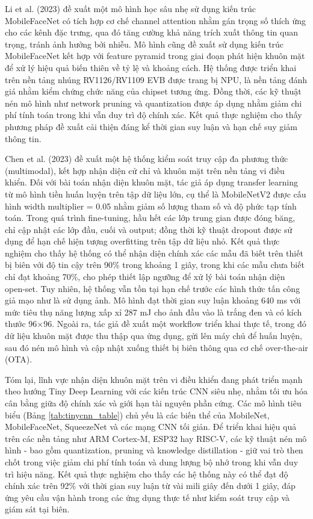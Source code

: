 Li et al. (2023)\cite{17_10128985} đề xuất một mô hình học sâu nhẹ sử dụng kiến trúc MobileFaceNet có tích hợp cơ chế channel attention nhằm gán trọng số thích ứng cho các kênh đặc trưng, qua đó tăng cường khả năng trích xuất thông tin quan trọng, tránh ảnh hưởng bởi nhiễu. Mô hình cũng đề xuất sử dụng kiến trúc MobileFaceNet kết hợp với feature pyramid trong giai đoạn phát hiện khuôn mặt để xử lý hiệu quả biến thiên về tỷ lệ và khoảng cách. Hệ thống được triển khai trên nền tảng nhúng RV1126/RV1109 EVB được trang bị NPU, là nền tảng đánh giá nhằm kiểm chứng chức năng của chipset tương ứng. Đồng thời, các kỹ thuật nén mô hình như network pruning và quantization được áp dụng nhằm giảm chi phí tính toán trong khi vẫn duy trì độ chính xác. Kết quả thực nghiệm cho thấy phương pháp đề xuất cải thiện đáng kể thời gian suy luận và hạn chế suy giảm thông tin.

Chen et al. (2023)\cite{35_10457480} đề xuất một hệ thống kiểm soát truy cập đa phương thức (multimodal), kết hợp nhận diện cử chỉ và khuôn mặt trên nền tảng vi điều khiển. Đối với bài toán nhận diện khuôn mặt, tác giả áp dụng transfer learning từ mô hình tiền huấn luyện trên tập dữ liệu lớn, cụ thể là MobileNetV2 được cấu hình width multiplier = 0.05 nhằm giảm số lượng tham số và độ phức tạp tính toán. Trong quá trình fine-tuning, hầu hết các lớp trung gian được đóng băng, chỉ cập nhật các lớp đầu, cuối và output; đồng thời kỹ thuật dropout được sử dụng để hạn chế hiện tượng overfitting trên tập dữ liệu nhỏ. Kết quả thực nghiệm cho thấy hệ thống có thể nhận diện chính xác các mẫu đã biết trên thiết bị biên với độ tin cậy trên 90\% trong khoảng 1 giây, trong khi các mẫu chưa biết chỉ đạt khoảng 70\%, cho phép thiết lập ngưỡng để xử lý bài toán nhận diện open-set. Tuy nhiên, hệ thống vẫn tồn tại hạn chế trước các hình thức tấn công giả mạo như là sử dụng ảnh. Mô hình đạt thời gian suy luận khoảng 640 ms với mức tiêu thụ năng lượng xấp xỉ 287 mJ cho ảnh đầu vào là trắng đen và có kích thước 96×96. Ngoài ra, tác giả đề xuất một workflow triển khai thực tế, trong đó dữ liệu khuôn mặt được thu thập qua ứng dụng, gửi lên máy chủ để huấn luyện, sau đó nén mô hình và cập nhật xuống thiết bị biên thông qua cơ chế over-the-air (OTA).

Tóm lại, lĩnh vực nhận diện khuôn mặt trên vi điều khiển đang phát triển mạnh theo hướng Tiny Deep Learning với các kiến trúc CNN siêu nhẹ, nhằm tối ưu hóa cân bằng giữa độ chính xác và giới hạn tài nguyên phần cứng. Các mô hình tiêu biểu (Bảng \ref{tab:tinycnn_table}) chủ yếu là các biến thể của MobileNet, MobileFaceNet, SqueezeNet và các mạng CNN tối giản. Để triển khai hiệu quả trên các nền tảng như ARM Cortex-M, ESP32 hay RISC-V, các kỹ thuật nén mô hình - bao gồm quantization, pruning và knowledge distillation - giữ vai trò then chốt trong việc giảm chi phí tính toán và dung lượng bộ nhớ trong khi vẫn duy trì hiệu năng. Kết quả thực nghiệm cho thấy các hệ thống này có thể đạt độ chính xác trên 92\% với thời gian suy luận từ vài mili giây đến dưới 1 giây, đáp ứng yêu cầu vận hành trong các ứng dụng thực tế như kiểm soát truy cập và giám sát tại biên.

